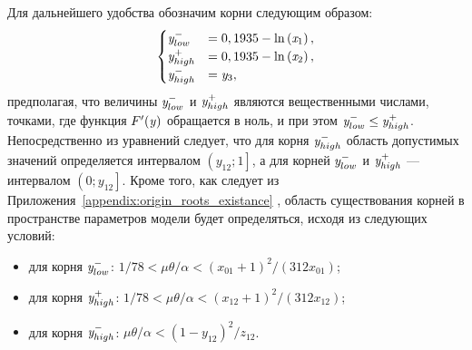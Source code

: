 Для дальнейшего удобства обозначим корни следующим образом:
\begin{equation}
    \begin{cases}
        \label{eq:origin_stability_bounds_y}
        \mathit{y}^{-}_{low}    &= 0,1935 - \ln\left( \mathit{x}_{1} \right), \\
        \mathit{y}^{+}_{high}   &= 0,1935 - \ln\left( \mathit{x}_{2} \right), \\
        \mathit{y}^{-}_{high}   &= \mathit{y}_{3}, \\
    \end{cases}
\end{equation}
предполагая, что величины $\mathit{y}^{-}_{low}$ и $\mathit{y}^{+}_{high}$ являются вещественными числами, \ie точками, где функция $F^{\prime}(\mathit{y})$ обращается в ноль, и при этом $\mathit{y}^{-}_{low} \le \mathit{y}^{+}_{high}$. Непосредственно из уравнений следует, что для корня $\mathit{y}^{-}_{high}$ область допустимых значений определяется интервалом $\left(y_{12}; 1\right]$, а для корней $\mathit{y}^{-}_{low}$ и $\mathit{y}^{+}_{high}$ --- интервалом $\left(0; y_{12}\right]$. Кроме того, как следует из Приложения~\ref{appendix:origin_roots_existance} , область существования корней в пространстве параметров модели будет определяться, исходя из следующих условий:
\begin{itemize}
    \item для корня $\mathit{y}^{-}_{low}$: $1 / 78 < \mu \theta / \alpha < (x_{01} + 1)^{2} / (312 x_{01})$;
    \item для корня $\mathit{y}^{+}_{high}$: $1 / 78 < \mu \theta / \alpha < (x_{12} + 1)^{2} / (312 x_{12})$;
    \item для корня $\mathit{y}^{-}_{high}$: $\mu \theta / \alpha < \left(1 - y_{12}\right)^{2} / z_{12}$.
\end{itemize}

